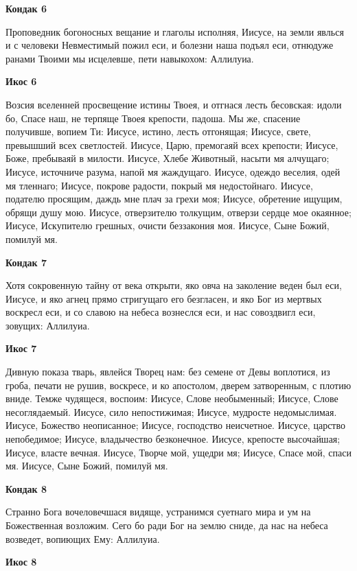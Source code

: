 \medskip
\bfseries Кондак 6\normalfont{}


Проповедник
богоносных вещание и глаголы исполняя, Иисусе, на земли явлься и с человеки Невместимый пожил еси, и болезни наша подъял еси, отнюдуже ранами Твоими мы исцелевше, пети навыкохом: Аллилуиа.


\medskip
\bfseries Икос 6\normalfont{}


Возсия
вселенней просвещение истины Твоея, и отгнася лесть бесовская: идоли бо, Спасе наш, не терпяще Твоея крепости, падоша. Мы же, спасение получивше, вопием Ти: Иисусе, истино, лесть отгонящая; Иисусе, свете, превышший всех светлостей. Иисусе, Царю, премогаяй всех крепости; Иисусе, Боже, пребываяй в милости. Иисусе, Хлебе Животный, насыти мя алчущаго; Иисусе, источниче разума, напой мя жаждущаго. Иисусе, одеждо веселия, одей мя тленнаго; Иисусе, покрове радости, покрый мя недостойнаго. Иисусе, подателю просящим, даждь мне плач за грехи моя; Иисусе, обретение ищущим, обрящи душу мою. Иисусе, отверзителю толкущим, отверзи сердце мое окаянное; Иисусе, Искупителю грешных, очисти беззакония моя. Иисусе, Сыне Божий, помилуй мя.


\medskip
\bfseries Кондак 7\normalfont{}


Хотя
сокровенную тайну от века открыти, яко овча на заколение веден был еси, Иисусе, и яко агнец прямо стригущаго его безгласен, и яко Бог из мертвых воскресл еси, и со славою на небеса вознеслся еси, и нас совоздвигл еси, зовущих: Аллилуиа. 


\medskip
\bfseries Икос 7\normalfont{}


Дивную
показа тварь, явлейся Творец нам: без семене от Девы воплотися, из гроба, печати не рушив, воскресе, и ко апостолом, дверем затворенным, с плотию вниде. Темже чудящеся, воспоим: Иисусе, Слове необыменный; Иисусе, Слове несоглядаемый. Иисусе, сило непостижимая; Иисусе,
мудросте недомыслимая. Иисусе, Божество неописанное; Иисусе, господство неисчетное. Иисусе, царство непобедимое; Иисусе, владычество безконечное. Иисусе, крепосте высочайшая; Иисусе, власте вечная. Иисусе, Творче мой, ущедри мя; Иисусе, Спасе мой, спаси мя. Иисусе, Сыне Божий, помилуй мя.


\medskip
\bfseries Кондак 8\normalfont{}


Странно
Бога вочеловечшася видяще, устранимся суетнаго мира и ум на Божественная возложим. Сего бо ради Бог на землю сниде, да нас на небеса возведет, вопиющих Ему: Аллилуиа. 


\medskip
\bfseries Икос 8\normalfont{}


